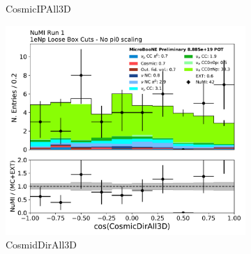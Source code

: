 \begin{figure}[H]
\begin{subfigure}{0.3\textwidth}
    \caption{CosmicIPAll3D}
    \end{subfigure}
    \begin{subfigure}{0.3\textwidth}
    \includegraphics[width=1.0\textwidth]{Sidebands/Figures/NuMI/1eNp/CosmicDirAll3D.pdf}
    \caption{CosmidDirAll3D}
    \end{subfigure}
    \caption{} 
    \label{fig:NuMI_1eNp_5}
\end{figure}
